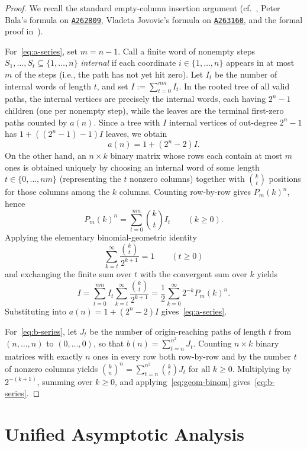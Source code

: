 \documentclass[11pt,a4paper]{article}
\theoremstyle{remark}
\newcommand{\oeis}[1]{\href{https://oeis.org/#1}{\texttt{#1}}}
\begin{document}
\begin{proof}
We recall the standard empty-column insertion argument (cf.~\cite{Eger2015}, Peter Bala's formula on \oeis{A262809}, Vladeta Jovovic's formula on \oeis{A263160}, and the formal proof in~\cite{Trureturing2026}).

For~\eqref{eq:a-series}, set $m=n-1$. Call a finite word of nonempty steps $S_1,\dots,S_t \subseteq \{1,\dots,n\}$ \emph{internal} if each coordinate $i\in\{1,\dots,n\}$ appears in at most $m$ of the steps (i.e., the path has not yet hit zero). Let $I_t$ be the number of internal words of length $t$, and set $I := \sum_{t=0}^{nm} I_t$. In the rooted tree of all valid paths, the internal vertices are precisely the internal words, each having $2^n-1$ children (one per nonempty step), while the leaves are the terminal first-zero paths counted by $a(n)$. Since a tree with $I$ internal vertices of out-degree $2^n-1$ has $1 + ((2^n-1)-1)I$ leaves, we obtain
\[
  a(n) = 1 + (2^n - 2)I.
\]
On the other hand, an $n\times k$ binary matrix whose rows each contain at most $m$ ones is obtained uniquely by choosing an internal word of some length $t\in\{0,\dots,nm\}$ (representing the $t$ nonzero columns) together with $\binom{k}{t}$ positions for those columns among the $k$ columns. Counting row-by-row gives $P_m(k)^n$, hence
\[
  P_m(k)^n = \sum_{t=0}^{nm} \binom{k}{t} I_t \qquad (k\ge 0).
\]
Applying the elementary binomial-geometric identity
\begin{equation}\label{eq:geom-binom}
  \sum_{k=t}^{\infty} \frac{\binom{k}{t}}{2^{k+1}} = 1 \qquad (t\ge 0)
\end{equation}
and exchanging the finite sum over $t$ with the convergent sum over $k$ yields
\[
  I = \sum_{t=0}^{nm} I_t \sum_{k=t}^{\infty} \frac{\binom{k}{t}}{2^{k+1}}
    = \frac{1}{2}\sum_{k=0}^{\infty} 2^{-k} P_m(k)^n.
\]
Substituting into $a(n) = 1 + (2^n-2)I$ gives~\eqref{eq:a-series}.

For~\eqref{eq:b-series}, let $J_t$ be the number of origin-reaching paths of length $t$ from $(n,\dots,n)$ to $(0,\dots,0)$, so that $b(n) = \sum_{t=n}^{n^2} J_t$. Counting $n\times k$ binary matrices with exactly $n$ ones in every row both row-by-row and by the number $t$ of nonzero columns yields $\binom{k}{n}^n = \sum_{t=n}^{n^2} \binom{k}{t} J_t$ for all $k\ge 0$. Multiplying by $2^{-(k+1)}$, summing over $k\ge 0$, and applying~\eqref{eq:geom-binom} gives~\eqref{eq:b-series}.
\end{proof}

\section{Unified Asymptotic Analysis}\label{sec:asymptotics}
\end{document}
